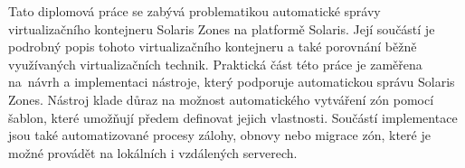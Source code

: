 Tato diplomová práce se zabývá problematikou automatické správy virtualizačního kontejneru Solaris Zones na platformě Solaris.
Její součástí je podrobný popis tohoto virtualizačního kontejneru a také porovnání běžně využívaných virtualizačních technik.
Praktická část této práce je zaměřena na~návrh a implementaci nástroje, který podporuje automatickou správu Solaris Zones.
Nástroj klade důraz na možnost automatického vytváření zón pomocí šablon, které umožňují předem definovat jejich vlastnosti.
Součástí implementace jsou také automatizované procesy zálohy, obnovy nebo migrace zón, které je možné provádět na lokálních
i vzdálených serverech.


